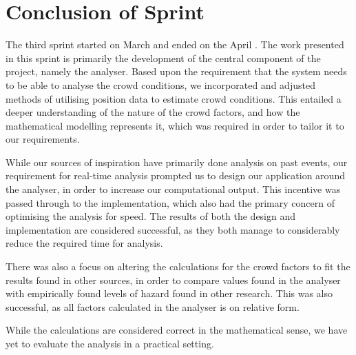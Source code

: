 \section{Conclusion of Sprint}
The third sprint started on March  and ended on the April . The work presented in this sprint is primarily the development of the central component of the project, namely the analyser. Based upon the requirement that the system needs to be able to analyse the crowd conditions, we incorporated and adjusted methods of utilising position data to estimate crowd conditions. This entailed a deeper understanding of the nature of the crowd factors, and how the mathematical modelling represents it, which was required in order to tailor it to our requirements.

While our sources of inspiration have primarily done analysis on past events, our requirement for real-time analysis prompted us to design our application around the analyser, in order to increase our computational output. This incentive was passed through to the implementation, which also had the primary concern of optimising the analysis for speed. The results of both the design and implementation are considered successful, as they both manage to considerably reduce the required time for analysis.

There was also a focus on altering the calculations for the crowd factors to fit the results found in other sources, in order to compare values found in the analyser with empirically found levels of hazard found in other research. This was also successful, as all factors calculated in the analyser is on relative form.

While the calculations are considered correct in the mathematical sense, we have yet to evaluate the analysis in a practical setting.